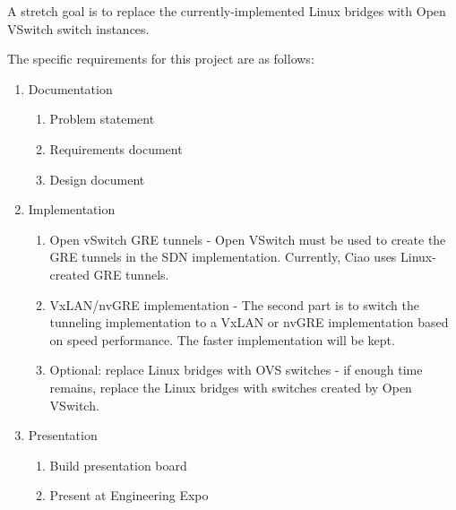 \documentclass[10pt,letterpaper,onecolumn,draftclsnofoot]{IEEEtran}
\begin{document}
A stretch goal is to replace the currently-implemented Linux bridges with
Open VSwitch switch instances.

The specific requirements for this project are as follows:

\begin{enumerate}
	\item Documentation
		\begin{enumerate}
			\item Problem statement
			\item Requirements document
			\item Design document
		\end{enumerate}
	\item Implementation
		\begin{enumerate}
			\item Open vSwitch GRE tunnels - Open VSwitch must be
				used to create the GRE tunnels in the SDN
				implementation. Currently, Ciao uses
				Linux-created GRE tunnels.
			\item VxLAN/nvGRE implementation - The second part is
				to switch the tunneling implementation to a
				VxLAN or nvGRE implementation based on speed
				performance. The faster implementation will be
				kept.
			\item Optional: replace Linux bridges with OVS
				switches - if enough time remains, replace the
				Linux bridges with switches created by Open
				VSwitch.
		\end{enumerate}
	\item Presentation
		\begin{enumerate}
			\item Build presentation board
			\item Present at Engineering Expo
		\end{enumerate}
\end{enumerate}
\end{document}
